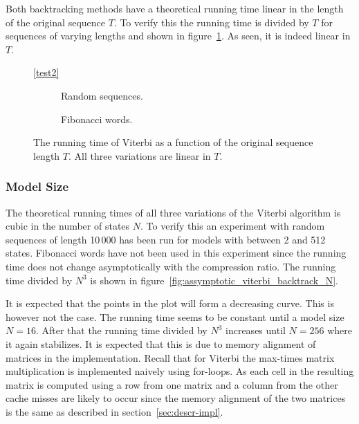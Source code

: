 Both backtracking methods have a theoretical running time linear in the length
of the original sequence $T$. To verify this the running time is divided by $T$
for sequences of varying lengths and shown in
figure~\ref{fig:assymptotic_viterbi_backtrack_T}. As seen, it is indeed linear
in $T$.

\begin{figure}
  \centering\ref{test2}\\
  \begin{subfigure}[b]{0.5\textwidth}
    \centering 
    \caption{Random sequences.}
  \end{subfigure}\hspace{-5mm}%
  \begin{subfigure}[b]{0.5\textwidth}
    \centering 
    \caption{Fibonacci words.}
  \end{subfigure}
  \caption{The running time of Viterbi as a function of the original sequence
    length $T$. All three variations are linear in $T$.}
  \label{fig:assymptotic_viterbi_backtrack_T}
\end{figure}

\subsubsection{Model Size}

The theoretical running times of all three variations of the Viterbi algorithm
is cubic in the number of states $N$. To verify this an experiment with random
sequences of length 10\,000 has been run for models with between 2 and 512
states. Fibonacci words have not been used in this experiment since the running
time does not change asymptotically with the compression ratio. The running time divided by $N^3$ is
shown in figure~\ref{fig:assymptotic_viterbi_backtrack_N}.

It is expected that the points in the plot will form a decreasing curve. This
is however not the case. The running time seems to be constant until a model
size $N = 16$. After that the running time divided by $N^3$ increases until
$N=256$ where it again stabilizes. It is expected that this is due to memory
alignment of matrices in the implementation. Recall that for Viterbi the
max-times matrix multiplication is implemented naively using for-loops. As each
cell in the resulting matrix is computed using a row from one matrix and a
column from the other cache misses are likely to occur since the memory
alignment of the two matrices is the same as described in
section~\ref{sec:descr-impl}.

